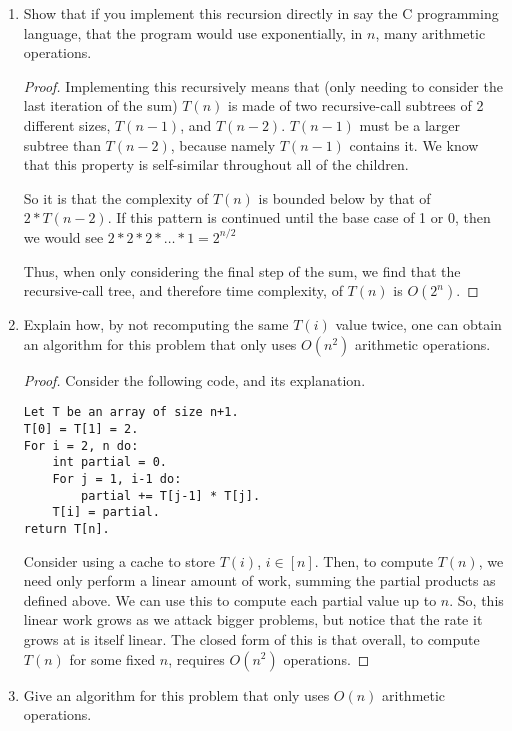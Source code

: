 \documentclass{article}
\begin{document}
	\begin{enumerate}[label=(\alph*)]
		\item Show that if you implement this recursion directly in say the C programming language, that the
		program would use exponentially, in $n$, many arithmetic operations.

		
		\begin{proof}
			Implementing this recursively means that (only needing to consider the last iteration of the sum) $T(n)$ is made of two recursive-call subtrees of 2 different sizes, $T(n-1)$, and $T(n-2)$.
			$T(n-1)$ must be a larger subtree than $T(n-2)$, because namely $T(n-1)$ contains it.
			We know that this property is self-similar throughout all of the children.

			So it is that the complexity of $T(n)$ is bounded below by that of $2*T(n-2)$.
			If this pattern is continued until the base case of 1 or 0, then we would see $2*2*2*\dots*1 = 2^{n/2}$
			
			Thus, when only considering the final step of the sum, we find that the recursive-call tree, and therefore time complexity, of $T(n)$ is $O(2^n)$.
		\end{proof}
	
		\item Explain how, by not recomputing the same $T(i)$ value twice, one can obtain an algorithm for this
		problem that only uses $O(n^2)$ arithmetic operations.
		
		\begin{proof}
			Consider the following code, and its explanation.
			\begin{lstlisting}
Let T be an array of size n+1.
T[0] = T[1] = 2.
For i = 2, n do:
	int partial = 0.
	For j = 1, i-1 do:
		partial += T[j-1] * T[j].
	T[i] = partial.
return T[n].
			\end{lstlisting}
			Consider using a cache to store $T(i)$, $i\in [n]$.
			Then, to compute $T(n)$, we need only perform a linear amount of work, summing the partial products as defined above.
			We can use this to compute each partial value up to $n$.
			So, this linear work grows as we attack bigger problems, but notice that the rate it grows at is itself linear.
			The closed form of this is that overall, to compute $T(n)$ for some fixed $n$, requires $O(n^2)$ operations.
		\end{proof}
		
		\item Give an algorithm for this problem that only uses $O(n)$ arithmetic operations.
	\end{enumerate}
	
	
\end{document}

